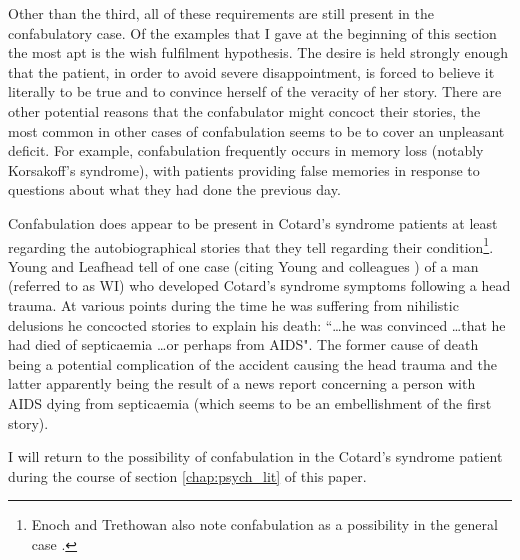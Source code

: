 Other than the third, all of these requirements are still present in the confabulatory case. Of the examples that I gave at the beginning of this section the most apt is the wish fulfilment hypothesis. The desire is held strongly enough that the patient, in order to avoid severe disappointment, is forced to believe it literally to be true and to convince herself of the veracity of her story. There are other potential reasons that the confabulator might concoct their stories, the most common in other cases of confabulation seems to be to cover an unpleasant deficit. For example, confabulation frequently occurs in memory loss (notably Korsakoff's syndrome), with patients providing false memories in response to questions about what they had done the previous day.

Confabulation does appear to be present in Cotard's syndrome patients at least regarding the autobiographical stories that they tell regarding their condition\footnote{Enoch and Trethowan also note confabulation as a possibility in the general case \cite[p. 177]{enoch1991}.}. Young and Leafhead tell of one case (citing Young and colleagues \cite{young1992}) of a man (referred to as WI) who developed Cotard's syndrome symptoms following a head trauma. At various points during the time he was suffering from nihilistic delusions he concocted stories to explain his death: ``\ldots he was convinced \ldots that he had died of septicaemia \ldots or perhaps from AIDS". The former cause of death being a potential complication of the accident causing the head trauma and the latter apparently being the result of a news report concerning a person with AIDS dying from septicaemia (which seems to be an embellishment of the first story).

I will return to the possibility of confabulation in the Cotard's syndrome patient during the course of section \ref{chap:psych_lit} of this paper.